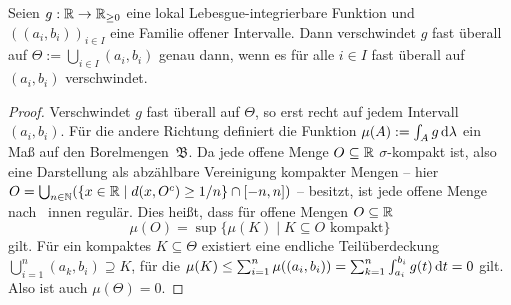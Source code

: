 \begin{lemma}\label{lemma-vanishes-intervals}
	Seien $g: \mathbb{R} \to \mathbb{R}_{\geq 0}$ eine lokal Lebesgue-integrierbare Funktion und $((a_i, b_i))_{i\in I}$ eine Familie offener Intervalle.
	Dann verschwindet $g$ fast überall auf $\Theta:=\bigcup_{i\in I} (a_i, b_i)$ genau dann, wenn es für alle $i\in I$ fast überall auf $(a_i, b_i)$ verschwindet.
\end{lemma}
\begin{proof}
	Verschwindet $g$ fast überall auf $\Theta$, so erst recht auf jedem Intervall $(a_i, b_i)$.
	Für die andere Richtung definiert die Funktion $\mu(A):= \int_A g \mathop{}\!\mathrm{d} \lambda$ ein Maß auf den Borelmengen~$\mathfrak{B}$.
	Da jede offene Menge $O\subseteq\mathbb{R}$ $\sigma$-kompakt ist, also eine Darstellung als abzählbare Vereinigung kompakter Mengen -- hier $O=\bigcup_{n\in\mathbb{N}}(\{ x \in\mathbb{R} \mid d(x, O^c) \geq 1/n \} \cap [-n, n] )$ -- besitzt, ist jede offene Menge nach~\cite[1.2 Folgerungen (e)]{Elstrodt2011} innen regulär.
	Dies heißt, dass für offene Mengen $O\subseteq\mathbb{R}$ $$\mu(O)=\sup\{ \mu(K) \mid K\subseteq O \text{ kompakt} \}$$ gilt.
	Für ein kompaktes $K\subseteq \Theta$ existiert eine endliche Teilüberdeckung $\bigcup_{i=1}^n (a_k, b_i) \supseteq K$, für die $\mu(K) \leq \sum_{i=1}^{n} \mu((a_i, b_i)) = \sum_{k=1}^{n} \int_{a_i}^{b_i} g(t) \mathop{}\!\mathrm{d} t = 0$ gilt.
	Also ist auch $\mu(\Theta)=0$.
\end{proof}

